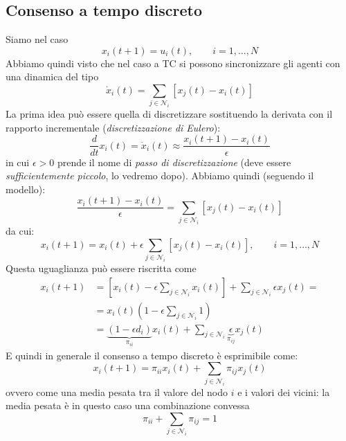 \subsection{Consenso a tempo discreto}
Siamo nel caso
\begin{equation}
x_i(t+1) = u_i(t), \qquad i = 1, \dots, N
\end{equation}
Abbiamo quindi visto che nel caso a TC si possono sincronizzare gli agenti con una dinamica del tipo
\begin{equation}
\dot{x}_i (t) = \sum_{j \in \mathcal{N}_i} [x_j(t) - x_i(t)]
\end{equation}
La prima idea pu\`o essere quella di discretizzare sostituendo la derivata con il rapporto incrementale (\textit{discretizzazione di Eulero}):
\begin{equation}
\frac{d}{dt} x_i(t) = \dot{x}_i (t) \approx \frac{x_i(t+1) - x_i(t)}{\epsilon}
\end{equation}
in cui $\epsilon > 0$ prende il nome di \textit{passo di discretizzazione} (deve essere \textit{sufficientemente piccolo}, lo vedremo dopo). Abbiamo quindi (seguendo il modello):
\begin{equation}
\frac{x_i(t+1) - x_i(t)}{\epsilon} = \sum_{j \in \mathcal{N}_i} [x_j(t) - x_i(t)]
\end{equation}
da cui:
\begin{equation}
x_i(t+1) = x_i(t) + \epsilon \sum_{j \in \mathcal{N}_i} [x_j(t) - x_i(t)], \qquad i=1, \dots, N
\end{equation}
Questa uguaglianza pu\`o essere riscritta come
\begin{align*}
x_i(t+1) &= [x_i(t) - \epsilon \sum_{j \in \mathcal{N}_i} x_i(t)] + \sum_{j \in \mathcal{N}_i} \epsilon x_j(t) = \\
&= x_i(t) ( 1 - \epsilon \sum_{j \in \mathcal{N}_i} 1) \\
&= \underbrace{(1 - \epsilon d_i)}_{\pi_{ii}} x_i(t) + \sum_{j \in \mathcal{N}_i} \underbrace{\epsilon}_{\pi_{ij}} x_j(t)
\end{align*}
E quindi in generale il consenso a tempo discreto \`e esprimibile come:
\begin{equation}
x_i(t+1) = \pi_{ii} x_i(t) + \sum_{j \in \mathcal{N}_i} \pi_{ij} x_j(t)
\end{equation}
ovvero come una media pesata tra il valore del nodo $i$ e i valori dei vicini: la media pesata \`e in questo caso una combinazione convessa 
\begin{equation}
\pi_{ii} + \sum_{j \in \mathcal{N}_i} \pi_{ij} = 1
\end{equation}
